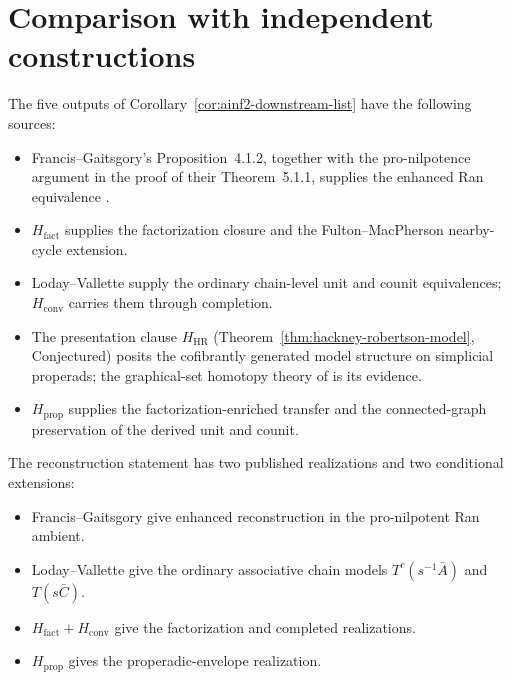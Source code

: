 \section{Comparison with independent constructions}\label{sec:ainf2-hziv}

\begin{remark}
\label{rem:ainf2-hziv}
The five outputs of Corollary~\ref{cor:ainf2-downstream-list} have the
following sources:
\begin{itemize}
\item Francis--Gaitsgory's Proposition~4.1.2, together with the
pro-nilpotence argument in the proof of their Theorem~5.1.1,
supplies the enhanced Ran equivalence \cite{Francis2012}.
\item $H_{\mathrm{fact}}$ supplies the factorization closure and the
Fulton--MacPherson nearby-cycle extension.
\item Loday--Vallette \cite[Corollary~2.3.4]{LV12} supply the ordinary
chain-level unit and counit equivalences; $H_{\mathrm{conv}}$ carries
them through completion.
\item The presentation clause $H_{\mathrm{HR}}$
(Theorem~\ref{thm:hackney-robertson-model}, Conjectured) posits the
cofibrantly generated model structure on simplicial properads; the
graphical-set homotopy theory of \cite{HRY17} is its evidence.
\item $H_{\mathrm{prop}}$ supplies the factorization-enriched transfer
and the connected-graph preservation of the derived unit and counit.
\end{itemize}
\end{remark}

\begin{remark}
\label{rem:ainf2-hziv-koszul-reflection}
The reconstruction statement has two published realizations and two
conditional extensions:
\begin{itemize}
\item Francis--Gaitsgory give enhanced reconstruction in the
pro-nilpotent Ran ambient.
\item Loday--Vallette give the ordinary associative chain models
$T^c(s^{-1}\bar A)$ and $T(s\bar C)$.
\item $H_{\mathrm{fact}}+H_{\mathrm{conv}}$ give the factorization and
completed realizations.
\item $H_{\mathrm{prop}}$ gives the properadic-envelope realization.
\end{itemize}
\end{remark}

